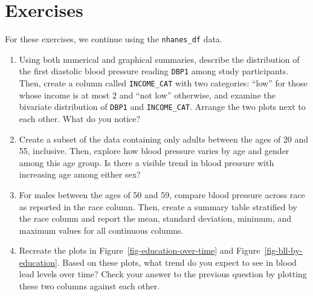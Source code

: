 \documentclass[
  letterpaper,
]{latex/krantz}
\begin{document}
\section{Exercises}\label{exercises-2}

For these exercises, we continue using the \texttt{nhanes\_df} data.

\begin{enumerate}
\def\labelenumi{\arabic{enumi}.}
\item
  Using both numerical and graphical summaries, describe the
  distribution of the first diastolic blood pressure reading
  \texttt{DBP1} among study participants. Then, create a column called
  \texttt{INCOME\_CAT} with two categories: ``low'' for those whose
  income is at most 2 and ``not low'' otherwise, and examine the
  bivariate distribution of \texttt{DBP1} and \texttt{INCOME\_CAT}.
  Arrange the two plots next to each other. What do you notice?
\item
  Create a subset of the data containing only adults between the ages of
  20 and 55, inclusive. Then, explore how blood pressure varies by age
  and gender among this age group. Is there a visible trend in blood
  pressure with increasing age among either sex?
\item
  For males between the ages of 50 and 59, compare blood pressure across
  race as reported in the race column. Then, create a summary table
  stratified by the race column and report the mean, standard deviation,
  minimum, and maximum values for all continuous columns.
\item
  Recreate the plots in Figure~\ref{fig-education-over-time} and
  Figure~\ref{fig-bll-by-education}. Based on these plots, what trend do
  you expect to see in blood lead levels over time? Check your answer to
  the previous question by plotting these two columns against each
  other.
\end{enumerate}
\end{document}
